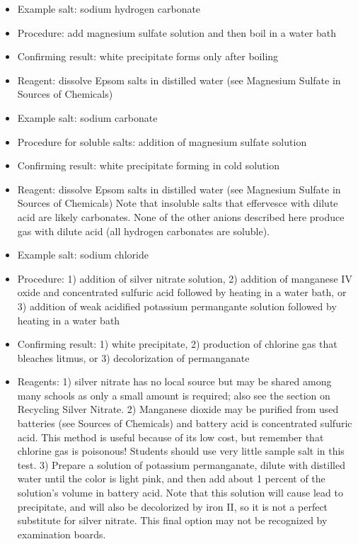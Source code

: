 
\begin{itemize}
\item{Example salt: sodium hydrogen carbonate}
\item{Procedure: add magnesium sulfate solution 
and then boil in a water bath}
\item{Confirming result: white precipitate forms only after boiling}
\item{Reagent: dissolve Epsom salts in distilled water 
(see Magnesium Sulfate in Sources of Chemicals)}
\end{itemize}

\begin{itemize}
\item{Example salt: sodium carbonate}
\item{Procedure for soluble salts: addition of magnesium sulfate solution}
\item{Confirming result: white precipitate forming in cold solution}
\item{Reagent: dissolve Epsom salts in distilled water 
(see Magnesium Sulfate in Sources of Chemicals)}
Note that insoluble salts that effervesce 
with dilute acid are likely carbonates. 
None of the other anions described here produce gas with dilute acid 
(all hydrogen carbonates are soluble).
\end{itemize}

\begin{itemize}
\item{Example salt: sodium chloride}
\item{Procedure: 1) addition of silver nitrate solution, 
2) addition of manganese IV oxide and concentrated sulfuric acid 
followed by heating in a water bath, 
or 3) addition of weak acidified potassium permangante solution 
followed by heating in a water bath}
\item{Confirming result: 1) white precipitate, 
2) production of chlorine gas that bleaches litmus, 
or 3) decolorization of permanganate}
\item{Reagents: 1) silver nitrate has no local source 
but may be shared among many schools as only a small amount is required; 
also see the section on Recycling Silver Nitrate. 
2) Manganese dioxide may be purified from used batteries 
(see Sources of Chemicals) and battery acid is concentrated sulfuric acid. 
This method is useful because of its low cost, 
but remember that chlorine gas is poisonous! 
Students should use very little sample salt in this test. 
3) Prepare a solution of potassium permanganate, 
dilute with distilled water until the color is light pink, 
and then add about 1 percent of the solution's volume in battery acid. 
Note that this solution will cause lead to precipitate, 
and will also be decolorized by iron II, 
so it is not a perfect substitute for silver nitrate. 
This final option may not be recognized by examination boards.}
\end{itemize}

